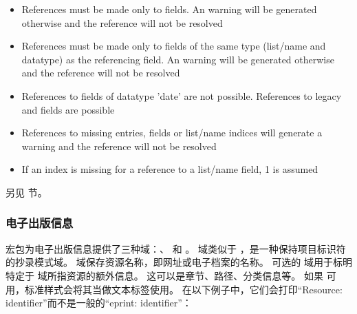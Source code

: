 \begin{itemize}
  \item References must be made only to  fields. An warning will be generated otherwise and the reference will not be resolved
  \item References must be made only to  fields of the same type (list/name and datatype) as the referencing field. An warning will be generated otherwise and the reference will not be resolved
  \item References to fields of datatype 'date' are not possible. References to legacy  and  fields are possible
  \item References to missing entries, fields or list/name indices will generate a warning and the reference will not be resolved
  \item If an index is missing for a reference to a list/name field, 1 is assumed
\end{itemize}

另见  节。

\subsubsection{电子出版信息}%
\label{use:use:epr}


\biblatex 宏包为电子出版信息提供了三种域：、 和 。
 域类似于 ，是一种保持项目标识符的抄录模式域。
 域保存资源名称，即网址或电子档案的名称。
可选的  域用于标明特定于  域所指资源的额外信息。
这可以是章节、路径、分类信息等。
如果  可用，标准样式会将其当做文本标签使用。
在以下例子中，它们会打印“Resource: identifier”而不是一般的“eprint: identifier”：

